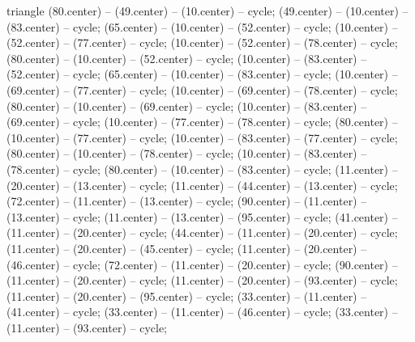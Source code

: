 {\begin{pgfonlayer}{triangle}
 (80.center) -- (49.center) -- (10.center) -- cycle; 
 (49.center) -- (10.center) -- (83.center) -- cycle; 
 (65.center) -- (10.center) -- (52.center) -- cycle; 
 (10.center) -- (52.center) -- (77.center) -- cycle; 
 (10.center) -- (52.center) -- (78.center) -- cycle; 
 (80.center) -- (10.center) -- (52.center) -- cycle; 
 (10.center) -- (83.center) -- (52.center) -- cycle; 
 (65.center) -- (10.center) -- (83.center) -- cycle; 
 (10.center) -- (69.center) -- (77.center) -- cycle; 
 (10.center) -- (69.center) -- (78.center) -- cycle; 
 (80.center) -- (10.center) -- (69.center) -- cycle; 
 (10.center) -- (83.center) -- (69.center) -- cycle; 
 (10.center) -- (77.center) -- (78.center) -- cycle; 
 (80.center) -- (10.center) -- (77.center) -- cycle; 
 (10.center) -- (83.center) -- (77.center) -- cycle; 
 (80.center) -- (10.center) -- (78.center) -- cycle; 
 (10.center) -- (83.center) -- (78.center) -- cycle; 
 (80.center) -- (10.center) -- (83.center) -- cycle; 
 (11.center) -- (20.center) -- (13.center) -- cycle; 
 (11.center) -- (44.center) -- (13.center) -- cycle; 
 (72.center) -- (11.center) -- (13.center) -- cycle; 
 (90.center) -- (11.center) -- (13.center) -- cycle; 
 (11.center) -- (13.center) -- (95.center) -- cycle; 
 (41.center) -- (11.center) -- (20.center) -- cycle; 
 (44.center) -- (11.center) -- (20.center) -- cycle; 
 (11.center) -- (20.center) -- (45.center) -- cycle; 
 (11.center) -- (20.center) -- (46.center) -- cycle; 
 (72.center) -- (11.center) -- (20.center) -- cycle; 
 (90.center) -- (11.center) -- (20.center) -- cycle; 
 (11.center) -- (20.center) -- (93.center) -- cycle; 
 (11.center) -- (20.center) -- (95.center) -- cycle; 
 (33.center) -- (11.center) -- (41.center) -- cycle; 
 (33.center) -- (11.center) -- (46.center) -- cycle; 
 (33.center) -- (11.center) -- (93.center) -- cycle; 

\end{pgfonlayer}}
